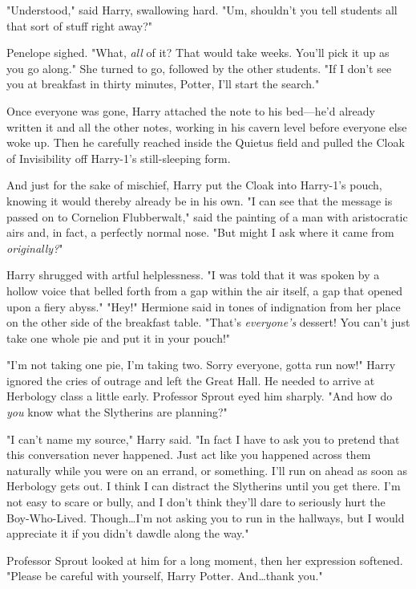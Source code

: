 "Understood," said Harry, swallowing hard. "Um, shouldn't you tell students all
that sort of stuff right away?"

Penelope sighed. "What, \emph{all} of it? That would take weeks. You'll pick it
up as you go along." She turned to go, followed by the other students. "If I
don't see you at breakfast in thirty minutes, Potter, I'll start the search."

Once everyone was gone, Harry attached the note to his bed---he'd already
written it and all the other notes, working in his cavern level before everyone
else woke up. Then he carefully reached inside the Quietus field and pulled the
Cloak of Invisibility off Harry-1's still-sleeping form.

And just for the sake of mischief, Harry put the Cloak into Harry-1's pouch,
knowing it would thereby already be in his own.
\later
"I can see that the message is passed on to Cornelion Flubberwalt," said the
painting of a man with aristocratic airs and, in fact, a perfectly normal nose.
"But might I ask where it came from \emph{originally?}"

Harry shrugged with artful helplessness. "I was told that it was spoken by a
hollow voice that belled forth from a gap within the air itself, a gap that
opened upon a fiery abyss."
\later
"Hey!" Hermione said in tones of indignation from her place on the other side
of the breakfast table. "That's \emph{everyone's} dessert! You can't just take
one whole pie and put it in your pouch!"

"I'm not taking one pie, I'm taking two. Sorry everyone, gotta run now!" Harry
ignored the cries of outrage and left the Great Hall. He needed to arrive at
Herbology class a little early.
\later
Professor Sprout eyed him sharply. "And how do \emph{you} know what the
Slytherins are planning?"

"I can't name my source," Harry said. "In fact I have to ask you to pretend
that this conversation never happened. Just act like you happened across them
naturally while you were on an errand, or something. I'll run on ahead as soon
as Herbology gets out. I think I can distract the Slytherins until you get
there. I'm not easy to scare or bully, and I don't think they'll dare to
seriously hurt the Boy-Who-Lived. Though…I'm not asking you to run in
the hallways, but I would appreciate it if you didn't dawdle along the way."

Professor Sprout looked at him for a long moment, then her expression softened.
"Please be careful with yourself, Harry Potter. And…thank you."

